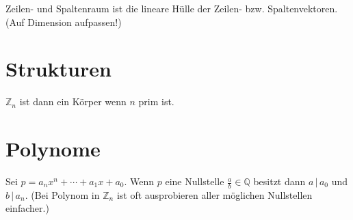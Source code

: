 \documentclass{article}
\begin{document}
\begin{multicols}{2}
Zeilen- und Spaltenraum ist die lineare Hülle der Zeilen- bzw. Spaltenvektoren. (Auf Dimension aufpassen!)

\section*{Strukturen}

$\mathbb{Z}_n$ ist dann ein Körper wenn $n$ prim ist.

\section*{Polynome}

Sei $p = a_nx^n + \cdots + a_1x + a_0$. Wenn $p$ eine Nullstelle $\frac{a}{b} \in \mathbb{Q}$ besitzt dann $a\,|\,a_0$ und $b\,|\,a_n$. (Bei Polynom in $\mathbb{Z}_n$ ist oft ausprobieren aller möglichen Nullstellen einfacher.) 

\end{multicols}
\end{document}
